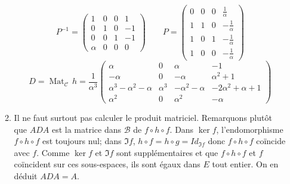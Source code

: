 \begin{enumerate}
\begin{enumerate}
\[
P^{-1}=\left( 
\begin{array}{cccc}
1 & 0 & 0 & 1 \\ 
0 & 1 & 0 & -1 \\ 
0 & 0 & 1 & -1 \\ 
\alpha  & 0 & 0 & 0
\end{array}
\right) \quad \quad P=\left( 
\begin{array}{cccc}
0 & 0 & 0 & \frac{1}{\alpha } \\ 
1 & 1 & 0 & -\frac{1}{\alpha } \\ 
1 & 0 & 1 & -\frac{1}{\alpha } \\ 
1 & 0 & 0 & -\frac{1}{\alpha }
\end{array}
\right) 
\]
\[
D=\mathop{\mathrm{Mat}}_{\mathcal C}\,h=\frac{1}{\alpha ^{3}}
\begin{pmatrix}
\alpha                    & 0        & \alpha            & -1 \\ 
-\alpha                   & 0        & -\alpha           & \alpha ^{2}+1 \\ 
\alpha^3-\alpha^2 -\alpha & \alpha^3 & -\alpha^2 -\alpha & -2\alpha ^{2}+\alpha +1 \\ 
\alpha^2                  & 0        & \alpha^2          & -\alpha
\end{pmatrix}
\]

\item Il ne faut surtout pas calculer le produit matriciel. Remarquons plut\^{o}t que $ADA$ est la matrice dans $\mathcal{B}$ de $f\circ h\circ f$.
Dans $\ker f$, l'endomorphisme $f\circ h\circ f$ est toujours nul; dans $%
\Im f$, $h\circ f=h\circ g=Id_{\Im f}$ donc $f\circ h\circ f$
co\"{i}ncide avec $f$. Comme $\ker f$ et $\Im f$ sont
suppl\'{e}mentaires et que $f\circ h\circ f$ et $f$ co\"{i}ncident sur ces
sous-espaces, ils sont \'{e}gaux dans $E$ tout entier. On en d\'{e}duit $%
ADA=A$.
\end{enumerate}
\end{enumerate}

